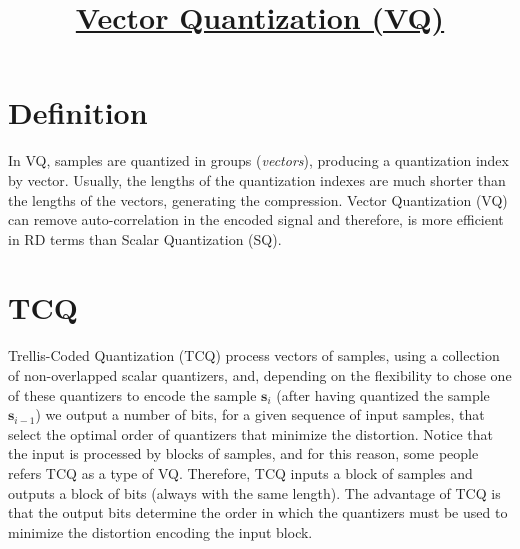 
\title{\href{https://github.com/vicente-gonzalez-ruiz/vector_quantization}{Vector Quantization (VQ)}}

\maketitle
\tableofcontents

\section{Definition}

In VQ, samples are quantized in groups (\emph{vectors}), producing a
quantization index by vector.  Usually, the lengths of the
quantization indexes are much shorter than the lengths of the vectors,
generating the compression. Vector Quantization (VQ) can remove
auto-correlation in the encoded signal and therefore, is more
efficient in RD terms than Scalar Quantization (SQ).



\section{TCQ}

Trellis-Coded Quantization (TCQ) process vectors of samples, using a
collection of non-overlapped scalar quantizers, and, depending on the
flexibility to chose one of these quantizers to encode the sample
${\mathbf s}_i$ (after having quantized the sample ${\mathbf
  s}_{i-1}$) we output a number of bits, for a given sequence of input
samples, that select the optimal order of quantizers that minimize the
distortion. Notice that the input is processed by blocks of samples,
and for this reason, some people refers TCQ as a type of
VQ. Therefore, TCQ inputs a block of samples and outputs a block of
bits (always with the same length). The advantage of TCQ is that the
output bits determine the order in which the quantizers must be used
to minimize the distortion encoding the input block.

